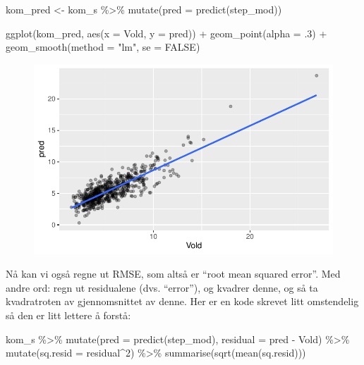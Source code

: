 \documentclass[
  letterpaper,
  DIV=11,
  numbers=noendperiod]{scrreprt}
\newenvironment{Shaded}{\begin{snugshade}}{\end{snugshade}}
\newcommand{\AttributeTok}[1]{\textcolor[rgb]{0.40,0.45,0.13}{#1}}
\newcommand{\ConstantTok}[1]{\textcolor[rgb]{0.56,0.35,0.01}{#1}}
\newcommand{\DecValTok}[1]{\textcolor[rgb]{0.68,0.00,0.00}{#1}}
\newcommand{\FunctionTok}[1]{\textcolor[rgb]{0.28,0.35,0.67}{#1}}
\newcommand{\NormalTok}[1]{\textcolor[rgb]{0.00,0.23,0.31}{#1}}
\newcommand{\OtherTok}[1]{\textcolor[rgb]{0.00,0.23,0.31}{#1}}
\newcommand{\SpecialCharTok}[1]{\textcolor[rgb]{0.37,0.37,0.37}{#1}}
\newcommand{\StringTok}[1]{\textcolor[rgb]{0.13,0.47,0.30}{#1}}
\theoremstyle{definition}
\theoremstyle{remark}
\begin{document}
\begin{Shaded}
\begin{Highlighting}[]
\NormalTok{kom\_pred }\OtherTok{\textless{}{-}}\NormalTok{ kom\_s }\SpecialCharTok{\%\textgreater{}\%} 
  \FunctionTok{mutate}\NormalTok{(}\AttributeTok{pred =} \FunctionTok{predict}\NormalTok{(step\_mod))}

\FunctionTok{ggplot}\NormalTok{(kom\_pred, }\FunctionTok{aes}\NormalTok{(}\AttributeTok{x =}\NormalTok{ Vold, }\AttributeTok{y =}\NormalTok{ pred)) }\SpecialCharTok{+}
  \FunctionTok{geom\_point}\NormalTok{(}\AttributeTok{alpha =}\NormalTok{ .}\DecValTok{3}\NormalTok{) }\SpecialCharTok{+}
  \FunctionTok{geom\_smooth}\NormalTok{(}\AttributeTok{method =} \StringTok{"lm"}\NormalTok{, }\AttributeTok{se =} \ConstantTok{FALSE}\NormalTok{)}
\end{Highlighting}
\end{Shaded}

\begin{figure}[H]

{\centering \includegraphics{./linear_regresjon_files/figure-pdf/unnamed-chunk-15-1.pdf}

}

\end{figure}

Nå kan vi også regne ut RMSE, som altså er ``root mean squared error''.
Med andre ord: regn ut residualene (dvs. ``error''), og kvadrer denne,
og så ta kvadratroten av gjennomsnittet av denne. Her er en kode skrevet
litt omstendelig så den er litt lettere å forstå:

\begin{Shaded}
\begin{Highlighting}[]
\NormalTok{kom\_s }\SpecialCharTok{\%\textgreater{}\%} 
  \FunctionTok{mutate}\NormalTok{(}\AttributeTok{pred =} \FunctionTok{predict}\NormalTok{(step\_mod), }
         \AttributeTok{residual =}\NormalTok{ pred }\SpecialCharTok{{-}}\NormalTok{ Vold) }\SpecialCharTok{\%\textgreater{}\%} 
  \FunctionTok{mutate}\NormalTok{(}\AttributeTok{sq.resid =}\NormalTok{ residual}\SpecialCharTok{\^{}}\DecValTok{2}\NormalTok{) }\SpecialCharTok{\%\textgreater{}\%} 
  \FunctionTok{summarise}\NormalTok{(}\FunctionTok{sqrt}\NormalTok{(}\FunctionTok{mean}\NormalTok{(sq.resid)))}
\end{Highlighting}
\end{Shaded}
\end{document}
